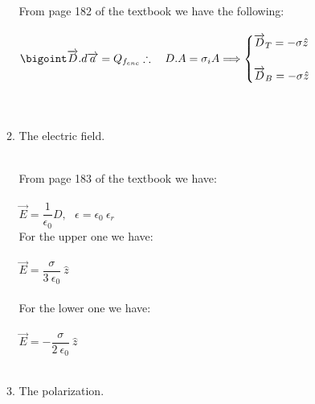 \documentclass[fleqn]{article}
\begin{document}
\begin{enumerate}
\begin{enumerate}
        \textcolor{hwColor}{
          \\
          From page 182 of the textbook we have the following:
          \\
          \\
          $
            \bigoint \overrightarrow{D} . d\overrightarrow{a}=Q_{f_{enc}}
            \\
            \\
            \therefore ~~~ D.A=\sigma_i A \Longrightarrow \begin{cases}
              \overrightarrow{D}_{T}=- \sigma \hat{z}
              \\
              \\
              \overrightarrow{D}_{B}=- \sigma \hat{z}
            \end{cases}
          $
          \\
          \\
          \\
        }

      \item The electric field.

        \textcolor{hwColor}{
          \\
          From page 183 of the textbook we have:
          \\
          \\
          $
            \overrightarrow{E}=\dfrac{1}{\epsilon_0} D, ~~~ \epsilon=\epsilon_0 ~ \epsilon_r
          $
          \\
          For the upper one we have:
          \\
          \\
          $
            \overrightarrow{E}=\dfrac{\sigma}{3 ~ \epsilon_0} ~ \hat{z}
          $
          \\
          \\
          For the lower one we have:
          \\
          \\
          $
            \overrightarrow{E}=-\dfrac{\sigma}{2 ~ \epsilon_0} ~ \hat{z}
          $
          \\
          \\
        }

      \item The polarization.


\end{enumerate}
\end{enumerate}
\end{document}
